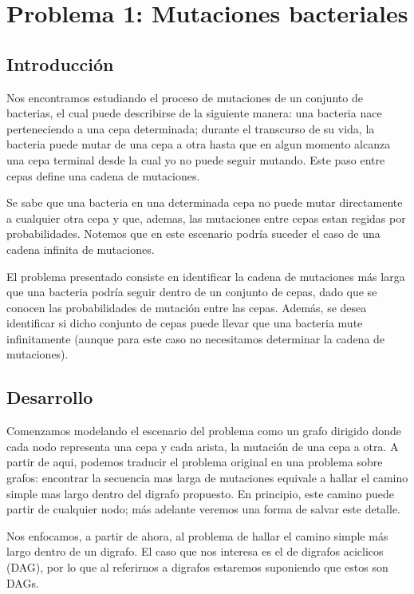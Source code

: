\section{Problema 1: Mutaciones bacteriales}
 
\subsection{Introducci\'on}

Nos encontramos estudiando el proceso de mutaciones de un conjunto de bacterias, el cual puede describirse de la siguiente manera:
una bacteria nace perteneciendo a una cepa determinada;
durante el transcurso de su vida, la bacteria puede mutar de una cepa a otra hasta que en
algun momento alcanza una cepa terminal desde la cual yo no puede seguir mutando. 
Este paso entre cepas define una cadena de mutaciones.

Se sabe que una bacteria en una determinada cepa no puede mutar directamente a cualquier otra cepa y que, ademas, las mutaciones entre cepas estan regidas por probabilidades.
Notemos que en este escenario podr\'ia suceder el caso de una cadena infinita de mutaciones.

El problema presentado consiste en identificar la cadena de mutaciones m\'as larga que una bacteria podr\'ia seguir dentro de un conjunto de cepas, dado que se conocen las probabilidades de mutaci\'on entre las cepas. Adem\'as, se desea identificar si dicho conjunto de cepas puede llevar que una bacteria mute infinitamente (aunque para este caso no necesitamos determinar la cadena de mutaciones).


\subsection{Desarrollo}


Comenzamos modelando el escenario del problema como un grafo dirigido donde cada nodo representa una cepa y cada arista, la mutación de una cepa a otra.
A partir de aqui, podemos traducir el problema original en una problema sobre grafos: encontrar la secuencia mas larga de mutaciones equivale a hallar el camino simple mas largo dentro del digrafo propuesto. En principio, este camino puede partir de cualquier nodo; más adelante veremos una forma de salvar este detalle.

Nos enfocamos, a partir de ahora, al problema de hallar el camino simple m\'as largo dentro de un digrafo. 
El caso que nos interesa es el de digrafos aciclicos (DAG), por lo que al referirnos a digrafos estaremos suponiendo que estos son DAGs.

